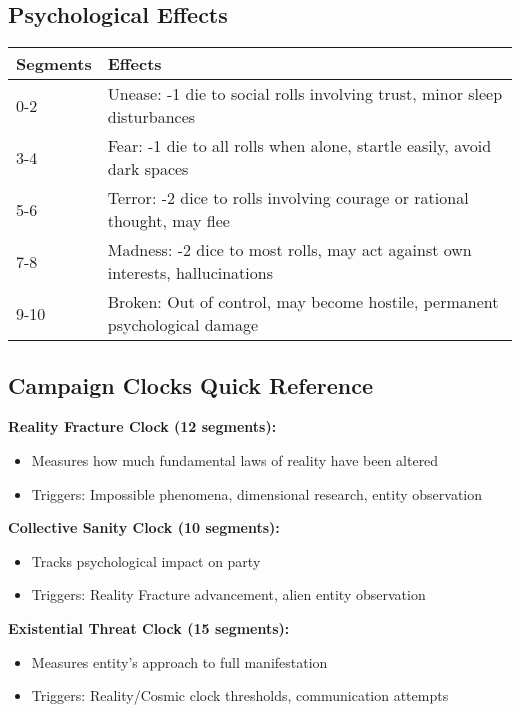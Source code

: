 \documentclass[11pt]{article}
\begin{document}
\subsection*{Psychological Effects}

\begin{tabular}{|p{2cm}|p{10cm}|}
\hline
\rowcolor{shadecolor}
\textbf{Segments} & \textbf{Effects} \\
\hline
0-2 & Unease: -1 die to social rolls involving trust, minor sleep disturbances \\
3-4 & Fear: -1 die to all rolls when alone, startle easily, avoid dark spaces \\
5-6 & Terror: -2 dice to rolls involving courage or rational thought, may flee \\
7-8 & Madness: -2 dice to most rolls, may act against own interests, hallucinations \\
9-10 & Broken: Out of control, may become hostile, permanent psychological damage \\
\hline
\end{tabular}

\subsection*{Campaign Clocks Quick Reference}

\textbf{Reality Fracture Clock (12 segments):}
\begin{itemize}
\item Measures how much fundamental laws of reality have been altered
\item Triggers: Impossible phenomena, dimensional research, entity observation
\end{itemize}

\textbf{Collective Sanity Clock (10 segments):}
\begin{itemize}
\item Tracks psychological impact on party
\item Triggers: Reality Fracture advancement, alien entity observation
\end{itemize}

\textbf{Existential Threat Clock (15 segments):}
\begin{itemize}
\item Measures entity's approach to full manifestation
\item Triggers: Reality/Cosmic clock thresholds, communication attempts
\end{itemize}
\end{document}
